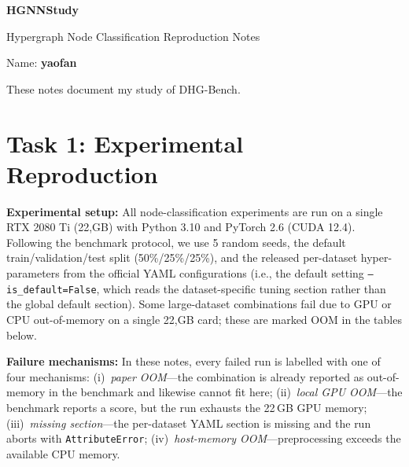\documentclass[11pt,a4paper]{article}
\begin{document}
\begin{center}
{\LARGE\bfseries HGNNStudy}\par\vspace{5pt}
{\large Hypergraph Node Classification Reproduction Notes}\par\vspace{8pt}
Name: \textbf{yaofan}
\end{center}
These notes document my study of DHG-Bench\cite{li2026dhg}.

\section*{Task 1: Experimental Reproduction}
\textbf{Experimental setup:} All node-classification experiments are run on a single RTX 2080 Ti (22,GB) with Python 3.10 and PyTorch 2.6 (CUDA 12.4). Following the benchmark protocol, we use 5 random seeds, the default train/validation/test split (50\%/25\%/25\%), and the released per-dataset hyper-parameters from the official YAML configurations (i.e., the default setting \texttt{--is\_default=False}, which reads the dataset-specific tuning section rather than the global default section). Some large-dataset combinations fail due to GPU or CPU out-of-memory on a single 22,GB card; these are marked OOM in the tables below.

\smallskip\noindent\textbf{Failure mechanisms:} In these notes, every failed run is labelled with one of four mechanisms:
(i)~\textit{paper OOM}—the combination is already reported as out-of-memory in the benchmark and likewise cannot fit here;
(ii)~\textit{local GPU OOM}—the benchmark reports a score, but the run exhausts the 22\,GB GPU memory;
(iii)~\textit{missing section}—the per-dataset YAML section is missing and the run aborts with \texttt{AttributeError};
(iv)~\textit{host-memory OOM}—preprocessing exceeds the available CPU memory.
\end{document}
